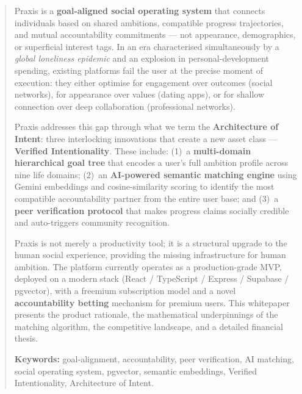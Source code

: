 \documentclass[11pt,a4paper]{article}
\begin{document}
\nopagecolor   %

\newpage
\tableofcontents

\newpage
\begin{abstract}
\noindent
Praxis is a \textbf{goal-aligned social operating system} that connects individuals based on shared ambitions, compatible progress trajectories, and mutual accountability commitments — not appearance, demographics, or superficial interest tags. In an era characterised simultaneously by a \textit{global loneliness epidemic} and an explosion in personal-development spending, existing platforms fail the user at the precise moment of execution: they either optimise for engagement over outcomes (social networks), for appearance over values (dating apps), or for shallow connection over deep collaboration (professional networks).

Praxis addresses this gap through what we term the \textbf{Architecture of Intent}: three interlocking innovations that create a new asset class — \textbf{Verified Intentionality}. These include: (1)~a \textbf{multi-domain hierarchical goal tree} that encodes a user's full ambition profile across nine life domains; (2)~an \textbf{AI-powered semantic matching engine} using Gemini embeddings and cosine-similarity scoring to identify the most compatible accountability partner from the entire user base; and (3)~a \textbf{peer verification protocol} that makes progress claims socially credible and auto-triggers community recognition.

Praxis is not merely a productivity tool; it is a structural upgrade to the human social experience, providing the missing infrastructure for human ambition. The platform currently operates as a production-grade MVP, deployed on a modern stack (React / TypeScript / Express / Supabase / pgvector), with a freemium subscription model and a novel \textbf{accountability betting} mechanism for premium users. This whitepaper presents the product rationale, the mathematical underpinnings of the matching algorithm, the competitive landscape, and a detailed financial thesis.

\bigskip
\noindent\textbf{Keywords:} goal-alignment, accountability, peer verification, AI matching, social operating system, pgvector, semantic embeddings, Verified Intentionality, Architecture of Intent.
\end{abstract}
\end{document}
